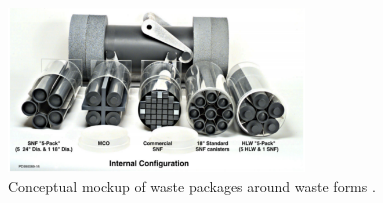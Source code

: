 \begin{figure}[htbp!]
  \begin{center}
    \includegraphics[width=0.7\textwidth]{./images/packages_ineel.eps}
  \end{center}
  \caption{Conceptual mockup of waste packages around waste forms 
    \cite{bridges_standardized_2001}.}
  \label{fig:packages}
\end{figure}
